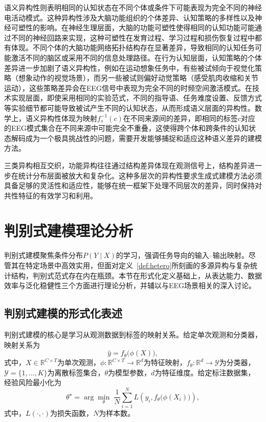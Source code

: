 语义异构性则表明相同的认知状态在不同个体或条件下可能表现为完全不同的神经电活动模式。这种异构性涉及大脑功能组织的个体差异、认知策略的多样性以及神经可塑性的影响。在神经生理层面，大脑的功能可塑性使得相同的认知功能可能通过不同的神经回路来实现，这种可塑性在发育过程、学习过程和损伤恢复过程中都有体现。不同个体的大脑功能网络拓扑结构存在显著差异，导致相同的认知任务可能激活不同的脑区或采用不同的信息处理路径。在行为认知层面，认知策略的个体差异进一步加剧了语义异构性，例如在运动想象任务中，有些被试倾向于视觉化策略（想象动作的视觉场景），而另一些被试则偏好动觉策略（感受肌肉收缩和关节运动），这些策略差异会在EEG信号中表现为完全不同的时频空间激活模式。在技术实现层面，即使采用相同的实验范式，不同的指导语、任务难度设置、反馈方式等实验细节都可能导致被试产生不同的认知状态，从而形成语义层面的异构性。数学上，语义异构性体现为映射$f_s^{-1}(c)$在不同来源间的差异，即相同的标签$c$对应的EEG模式集合在不同来源中可能完全不重叠，这使得跨个体和跨条件的认知状态解码成为一个极具挑战性的问题，需要开发能够捕捉和适应这种语义差异的建模方法。


三类异构相互交织，功能异构往往通过结构差异体现在观测信号上，结构差异进一步在统计分布层面被放大和复杂化。这种多层次的异构性要求生成式建模方法必须具备足够的灵活性和适应性，能够在统一框架下处理不同层次的差异，同时保持对共性特征的有效学习和利用。


\section{判别式建模理论分析}
判别式建模聚焦条件分布$P(Y\mid X)$的学习，强调任务导向的输入--输出映射。尽管其在特定场景中高效实用，但面对定义~\ref{def:hetero}所刻画的多源异构与复杂统计结构，判别式范式存在内在瓶颈。本节在形式化定义基础上，从表达能力、数据效率与泛化稳健性三个方面进行理论分析，并辅以与EEG场景相关的深入讨论。


\subsection{判别式建模的形式化表述}
判别式建模的核心是学习从观测数据到标签的映射关系。给定单次观测和分类器，映射关系为
\begin{equation}
\label{eq:disc-map}
\hat{y} = f_{\theta}\big(\phi(X)\big),
\end{equation}
式中，$X \in \mathbb{R}^{C \times T}$为单次观测，$\phi:\mathbb{R}^{C \times T}\to \mathbb{R}^{d}$为特征映射，$f_{\theta}:\mathbb{R}^{d}\to \mathcal{Y}$为分类器，$\mathcal{Y}=\{1,\dots,K\}$为离散标签集合，$\theta$为模型参数，$d$为特征维度。给定标注数据集，经验风险最小化为
\begin{equation}
\label{eq:emp-risk}
\theta^{\star} = \arg\min_{\theta}\; \frac{1}{N} \sum_{i=1}^{N} L\!\left(y_i, f_{\theta}\!\big(\phi(X_i)\big)\right),
\end{equation}
式中，$L(\cdot,\cdot)$为损失函数，$N$为样本数。

